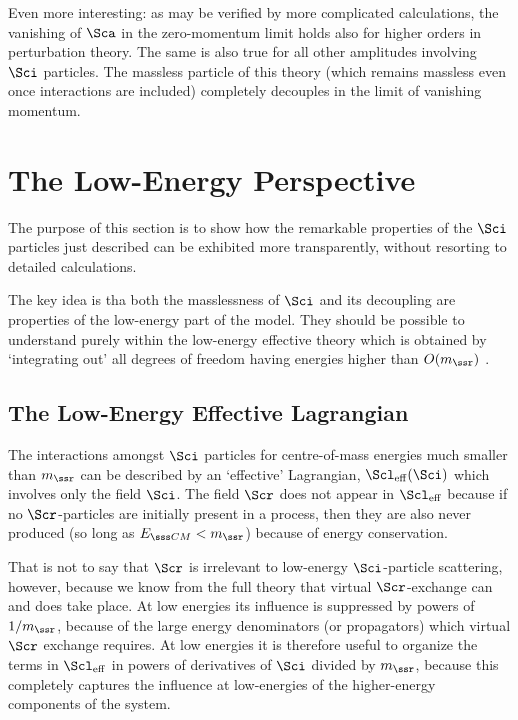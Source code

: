 Even more interesting: as may be verified by more complicated 
calculations, the vanishing of $\Sca$ in the zero-momentum limit 
holds also for higher orders in perturbation theory. The same is
also true for all other amplitudes involving $\Sci$ particles. The
massless particle of this theory (which remains massless even once
interactions are included) completely decouples in the limit of 
vanishing momentum.

\section{The Low-Energy Perspective}

The purpose of this section is to show how the remarkable properties 
of the $\Sci$ particles just described can be exhibited more 
transparently, without resorting to detailed calculations.

The key idea is tha both the masslessness of $\Sci$ 
and its decoupling are properties
of the low-energy part of the model. They should be possible to
understand purely within the low-energy effective theory 
which is obtained by `integrating out' all degrees of freedom 
having energies higher than $O(m_\ssr)$ \cite{ETbooks,ETreviews}. 

\subsection{The Low-Energy Effective Lagrangian}

The interactions amongst $\Sci$ particles for centre-of-mass
energies much smaller than $m_\ssr$ can be described by
an `effective' Lagrangian, $\Scl_{\rm eff}(\Sci)$ 
which involves only the field $\Sci$. The field $\Scr$ does not 
appear in $\Scl_{\rm eff}$ because if no $\Scr$-particles
are initially present in a process, then they are also never 
produced (so long as $E_{\sss CM} < m_\ssr$) because
of energy conservation.  

That is not to say that $\Scr$ is irrelevant to low-energy $\Sci$-particle
scattering, however, because we know from the full theory
that virtual $\Scr$-exchange can and does take place. At low
energies its influence is suppressed by powers of $1/m_\ssr$,
because of the large energy denominators (or propagators)
which virtual $\Scr$ exchange requires. At low energies it is 
therefore useful to organize the terms in $\Scl_{\rm eff}$ in
powers of derivatives of $\Sci$ divided by $m_\ssr$, because
this completely captures the influence at low-energies of the
higher-energy components of the system.

